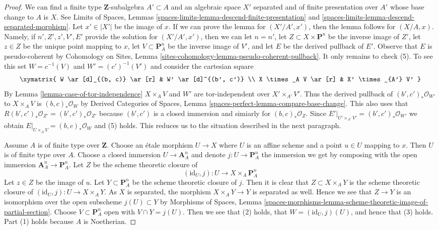 \begin{proof}
We can find a finite type $\mathbf{Z}$-subalgebra $A' \subset A$
and an algebraic space $X'$ separated and of finite presentation over $A'$
whose base change to $A$ is $X$. See
Limits of Spaces, Lemmas
\ref{spaces-limits-lemma-descend-finite-presentation} and
\ref{spaces-limits-lemma-descend-separated-morphism}.
Let $x' \in |X'|$ be the image of $x$.
If we can prove the lemma for $(X'/A', x')$, then
the lemma follows for $(X/A, x)$.
Namely, if $n', Z', z', V', E'$ provide the solution
for $(X'/A', x')$, then we can let
$n = n'$,
let $Z \subset X \times \mathbf{P}^n$ be the inverse image of $Z'$,
let $z \in Z$ be the unique point mapping to $x$,
let $V \subset \mathbf{P}^n_A$ be the inverse image of $V'$, and
let $E$ be the derived pullback of $E'$.
Observe that $E$ is pseudo-coherent by
Cohomology on Sites, Lemma
\ref{sites-cohomology-lemma-pseudo-coherent-pullback}.
It only remains to check (5). To see this
set $W = c^{-1}(V)$ and $W' = (c')^{-1}(V')$
and consider the cartesian square
$$
\xymatrix{
W \ar[d]_{(b, c)} \ar[r] & W' \ar[d]^{(b', c')} \\
X \times_A V \ar[r] & X' \times_{A'} V'
}
$$
By Lemma \ref{lemma-case-of-tor-independence} $X \times_A V$ and $W'$
are tor-independent over $X' \times_{A'} V'$.
Thus the derived pullback of
$(b', c')_*\mathcal{O}_{W'}$ to $X \times_A V$
is $(b, c)_*\mathcal{O}_W$ by
Derived Categories of Spaces,
Lemma \ref{spaces-perfect-lemma-compare-base-change}.
This also uses that $R(b', c')_*\mathcal{O}_{Z'} = (b', c')_*\mathcal{O}_{Z'}$
because $(b', c')$ is a closed immersion and simiarly for
$(b, c)_*\mathcal{O}_Z$.
Since $E'|_{U' \times_{A'} V'} =
(b', c')_*\mathcal{O}_{W'}$ we obtain
$E|_{U \times_A V} = (b, c)_*\mathcal{O}_W$
and (5) holds.
This reduces us to the situation described in the next
paragraph.

\medskip\noindent
Assume $A$ is of finite type over $\mathbf{Z}$.
Choose an \'etale morphism $U \to X$ where $U$ is an affine scheme
and a point $u \in U$ mapping to $x$. Then $U$ is of finite type over $A$.
Choose a closed immersion $U \to \mathbf{A}^n_A$ and denote
$j : U \to \mathbf{P}^n_A$ the immersion we get by composing
with the open immersion $\mathbf{A}^n_A \to \mathbf{P}^n_A$.
Let $Z$ be the scheme theoretic closure of
$$
(\text{id}_U, j) : U \longrightarrow X \times_A \mathbf{P}^n_A
$$
Let $z \in Z$ be the image of $u$.
Let $Y \subset \mathbf{P}^n_A$ be the scheme theoretic
closure of $j$. Then it is clear that $Z \subset X \times_A Y$
is the scheme theoretic closure of
$(\text{id}_U, j) : U \to X \times_A Y$.
As $X$ is separated, the morphism
$X \times_A Y \to Y$ is separated as well.
Hence we see that $Z \to Y$ is an isomorphism over
the open subscheme $j(U) \subset Y$ by
Morphisms of Spaces, Lemma
\ref{spaces-morphisms-lemma-scheme-theoretic-image-of-partial-section}.
Choose $V \subset \mathbf{P}^n_A$ open with $V \cap Y = j(U)$.
Then we see that (2) holds, that $W = (\text{id}_U, j)(U)$, and hence
that (3) holds. Part (1) holds because $A$ is Noetherian.


\end{proof}
